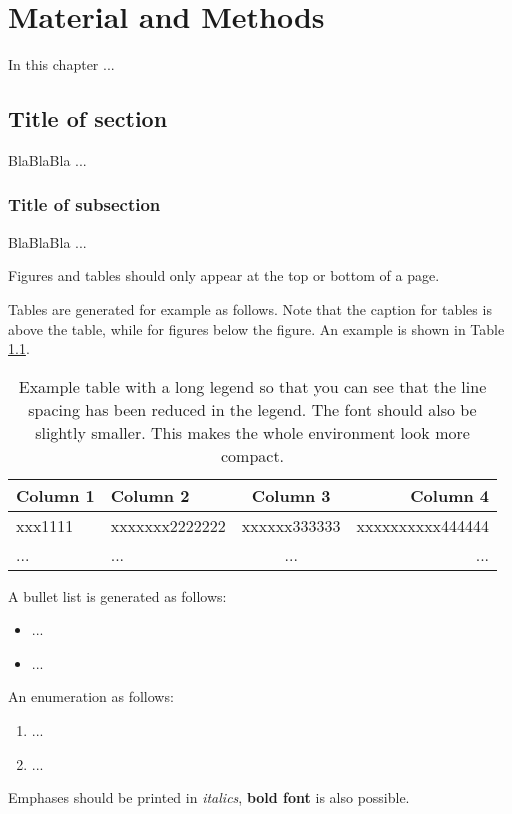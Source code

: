 
\chapter{Material and Methods}
  \label{MatMet}

\noindent
In this chapter ...

\section{Title of section}
  \label{Sectionabel} 

BlaBlaBla ...

\subsection{Title of subsection}
  \label{subsectionlabel}

BlaBlaBla ...

\noindent
Figures and tables should only appear at the top or bottom of a page.

\noindent
Tables are generated for example as follows. Note that the caption for tables is above the table, while for figures below the figure. An example is shown in Table \ref{tabelle-1}.

{
\renewcommand{\baselinestretch}{0.9} 
\normalsize
\begin{table}[tb]
  \caption[This short caption is for the list of tables]{Example table with a long legend so that you can see that the line spacing has been reduced in the legend. The font should also be slightly smaller. This makes the whole environment look more compact.}
  \label{tabelle-1}
\begin{tabular}{|p{2.7cm}||l|c|r|}
\hline
    \textbf{Column 1} 
  & \textbf{Column 2} 
  & \textbf{Column 3} 
  & \textbf{Column 4} \\
  \hline\hline
  xxx1111
  & xxxxxxx2222222
  & xxxxxx333333 
  & xxxxxxxxxx444444 \\
  \hline
    ...
  & ...
  & ...
  & ...\\
  \hline
\end{tabular}
\end{table}
}

\noindent
A bullet list is generated as follows:
\begin{itemize}
\item ...
\item ...
\end{itemize}
An enumeration as follows:
\begin{enumerate}
\item ...
\item ...
\end{enumerate}

Emphases should be printed in \emph{italics}, 
\textbf{bold font} is also possible.

